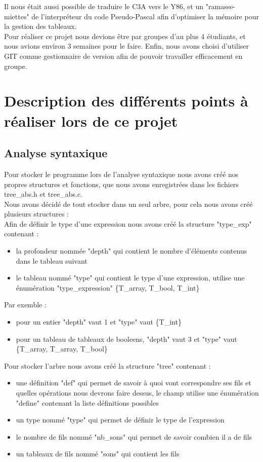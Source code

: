 \documentclass{report}
\begin{document}
Il nous était aussi possible de traduire le C3A vers le Y86, et un "ramasse-miettes" de l'interpréteur du code Pseudo-Pascal afin d'optimiser la mémoire pour la gestion des tableaux.\\

Pour réaliser ce projet nous devions être par groupes d'au plus 4 étudiants, et nous avions environ 3 semaines pour le faire.
Enfin, nous avons choisi d'utiliser GIT comme gestionnaire de version afin de pouvoir travailler efficacement en groupe.

\newpage

\section{Description des différents points à réaliser lors de ce projet}
\subsection{Analyse syntaxique}
Pour stocker le programme lors de l'analyse syntaxique nous avons créé nos propres structures et fonctions, que nous avons enregistrées dans les fichiers tree\_abs.h et tree\_abs.c.\\

Nous avons décidé de tout stocker dans un seul arbre, pour cela nous avons créé plusieurs structures :\\

Afin de définir le type d'une expression nous avons créé la structure "type\_exp" contenant :
\begin{itemize}
\item la profondeur nommée "depth" qui contient le nombre d'éléments contenus dans le tableau suivant
\item le tableau nommé "type" qui contient le type d'une expression, utilise une énumération "type\_expression" \{T\_array, T\_bool, T\_int\}
\end{itemize}
Par exemble :
\begin{itemize}
\item pour un entier "depth" vaut 1 et "type" vaut \{T\_int\}
\item pour un tableau de tableaux de booleens, "depth" vaut 3 et "type" vaut \{T\_array, T\_array, T\_bool\}
\end{itemize}
\bigskip

Pour stocker l'arbre nous avons créé la structure "tree" contenant :
\begin{itemize}
\item une définition "def" qui permet de savoir à quoi vont correspondre ses fils et quelles opérations nous devrons faire dessus, le champ utilise une énumération "define" contenant la liste définitions possibles
\item un type nommé "type" qui permet de définir le type de l'expression
\item le nombre de fils nommé "nb\_sons" qui permet de savoir combien il a de fils
\item un tableaux de fils nommé "sons" qui contient les fils
\end{itemize}
\bigskip
\end{document}
